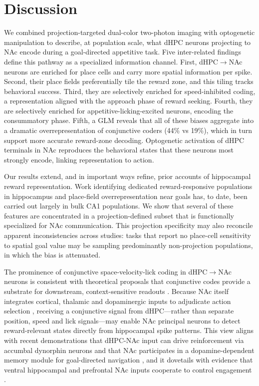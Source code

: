 \documentclass[11pt]{article}
\begin{document}


\section{Discussion}

We combined projection-targeted dual-color two-photon imaging with optogenetic manipulation to describe, at population scale, what dHPC neurons projecting to NAc encode during a goal-directed appetitive task. Five inter-related findings define this pathway as a specialized information channel. First, dHPC$\rightarrow$NAc neurons are enriched for place cells and carry more spatial information per spike. Second, their place fields preferentially tile the reward zone, and this tiling tracks behavioral success. Third, they are selectively enriched for speed-inhibited coding, a representation aligned with the approach phase of reward seeking. Fourth, they are selectively enriched for appetitive-licking-excited neurons, encoding the consummatory phase. Fifth, a GLM reveals that all of these biases aggregate into a dramatic overrepresentation of conjunctive coders (44\% vs 19\%), which in turn support more accurate reward-zone decoding. Optogenetic activation of dHPC terminals in NAc reproduces the behavioral states that these neurons most strongly encode, linking representation to action.

Our results extend, and in important ways refine, prior accounts of hippocampal reward representation. Work identifying dedicated reward-responsive populations in hippocampus \citep{Gauthier2018Reward,Sosa2018Reward} and place-field overrepresentation near goals \citep{Hok2007Goal,Mamad2017PlaceField,Sato2020Overrepresentation,Kaufman2020LocusCoeruleus} has, to date, been carried out largely in bulk CA1 populations. We show that several of these features are concentrated in a projection-defined subset that is functionally specialized for NAc communication. This projection specificity may also reconcile apparent inconsistencies across studies: tasks that report no place-cell sensitivity to spatial goal value \citep{Duvelle2019PlaceCells} may be sampling predominantly non-projection populations, in which the bias is attenuated.

The prominence of conjunctive space-velocity-lick coding in dHPC$\rightarrow$NAc neurons is consistent with theoretical proposals that conjunctive codes provide a substrate for downstream, context-sensitive readouts \citep{Xiao2020Conjunctive}. Because NAc itself integrates cortical, thalamic and dopaminergic inputs to adjudicate action selection \citep{Mogenson1980Motivation,Britt2012Synaptic,Jung2024Dopamine}, receiving a conjunctive signal from dHPC---rather than separate position, speed and lick signals---may enable NAc principal neurons to detect reward-relevant states directly from hippocampal spike patterns. This view aligns with recent demonstrations that dHPC-NAc input can drive reinforcement via accumbal dynorphin neurons \citep{Ibrahim2024DorsalHPC} and that NAc participates in a dopamine-dependent memory module for goal-directed navigation \citep{Jung2024Dopamine}, and it dovetails with evidence that ventral hippocampal and prefrontal NAc inputs cooperate to control engagement \citep{Iyer2025Engagement}.
\end{document}
